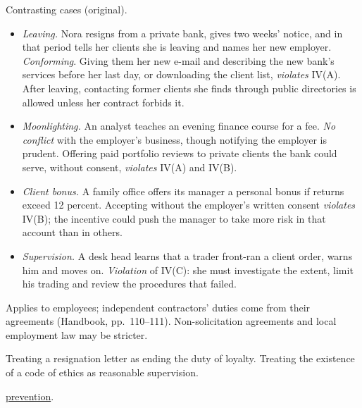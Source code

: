 \begin{qfrule}
 Contrasting cases (original).
\begin{itemize}
\item \emph{Leaving.} Nora resigns from a private bank, gives two weeks' notice, and in that period tells her clients she is leaving and names her new employer. \emph{Conforming}. Giving them her new e-mail and describing the new bank's services before her last day, or downloading the client list, \emph{violates} IV(A). After leaving, contacting former clients she finds through public directories is allowed unless her contract forbids it.
\item \emph{Moonlighting.} An analyst teaches an evening finance course for a fee. \emph{No conflict} with the employer's business, though notifying the employer is prudent. Offering paid portfolio reviews to private clients the bank could serve, without consent, \emph{violates} IV(A) and IV(B).
\item \emph{Client bonus.} A family office offers its manager a personal bonus if returns exceed 12 percent. Accepting without the employer's written consent \emph{violates} IV(B); the incentive could push the manager to take more risk in that account than in others.
\item \emph{Supervision.} A desk head learns that a trader front-ran a client order, warns him and moves on. \emph{Violation} of IV(C): she must investigate the extent, limit his trading and review the procedures that failed.
\end{itemize}

 Applies to employees; independent contractors' duties come from their agreements (Handbook, pp.~110--111). Non-solicitation agreements and local employment law may be stricter.

 Treating a resignation letter as ending the duty of loyalty. Treating the existence of a code of ethics as reasonable supervision.

 \hyperref[meth:preventing-employer-duty-violations]{prevention}.

\end{qfrule}

